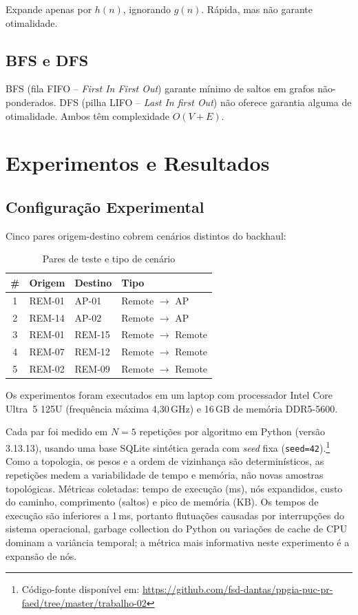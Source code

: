 \documentclass[conference]{IEEEtran}
\begin{document}
Expande apenas por $h(n)$, ignorando $g(n)$.
Rápida, mas não garante otimalidade.

\subsection{BFS e DFS}

BFS (fila FIFO – \textit{First In First Out}) garante mínimo de saltos em grafos 
não-ponderados.
DFS (pilha LIFO – \textit{Last In first Out}) não oferece garantia alguma de otimalidade.
Ambos têm complexidade $O(V+E)$.

\section{Experimentos e Resultados}

\subsection{Configuração Experimental}

Cinco pares origem-destino cobrem cenários distintos do backhaul:

\begin{table}[t]
\caption{Pares de teste e tipo de cenário}
\label{tab:pares}
\centering
\begin{tabular}{clll}
\toprule
\# & Origem  & Destino & Tipo \\
\midrule
1  & REM-01  & AP-01   & Remote $\to$ AP \\
2  & REM-14  & AP-02   & Remote $\to$ AP \\
3  & REM-01  & REM-15  & Remote $\to$ Remote \\
4  & REM-07  & REM-12  & Remote $\to$ Remote \\
5  & REM-02  & REM-09  & Remote $\to$ Remote \\
\bottomrule
\end{tabular}
\end{table}

Os experimentos foram executados em um laptop com processador Intel Core
Ultra~5 125U (frequência máxima 4,30\,GHz) e 16\,GB de memória DDR5-5600.

Cada par foi medido em $N = 5$ repetições por algoritmo em Python
(versão 3.13.13), usando uma base SQLite sintética gerada com \textit{seed} fixa
(\texttt{seed=42}).\footnote{Código-fonte disponível em:
\url{https://github.com/fsd-dantas/ppgia-puc-pr-faed/tree/master/trabalho-02}} Como a topologia, os pesos e a ordem de vizinhança são
determinísticos, as repetições medem a variabilidade de tempo e memória, não
novas amostras topológicas. Métricas coletadas: tempo de execução (ms), nós
expandidos, custo do caminho, comprimento (saltos) e pico de memória (KB).
Os tempos de execução são inferiores a 1\,ms, portanto flutuações causadas
por interrupções do sistema operacional, garbage collection do Python ou
variações de cache de CPU dominam a variância temporal; a métrica mais
informativa neste experimento é a expansão de nós.
\end{document}
